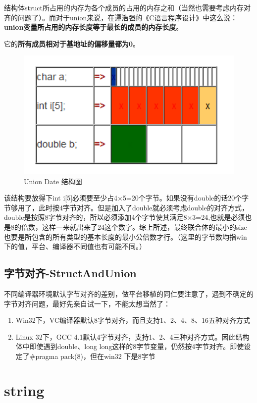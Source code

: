 \documentclass[UTF8,a4paper,12pt]{ctexbook} %
\begin{document}
	        结构体struct所占用的内存为各个成员的占用的内存之和（当然也需要考虑内存对齐的问题了）。而对于union来说，在谭浩强的《C语言程序设计》中这么说：\textbf{union变量所占用的内存长度等于最长的成员的内存长度}。
	        
	        它的\textbf{所有成员相对于基地址的偏移量都为0}。
	        
	        \begin{figure}[H]
	        	\centering
	        	\includegraphics[width = 12cm]{union2.png}
	        	\caption{Union Date 结构图}
	        \end{figure}
	        
	        该结构要放得下int i[5]必须要至少占4×5=20个字节。如果没有double的话20个字节够用了，此时按4字节对齐。但是加入了double就必须考虑double的对齐方式，double是按照8字节对齐的，所以必须添加4个字节使其满足8×3=24,也就是必须也是8的倍数，这样一来就出来了24这个数字。综上所述，最终联合体的最小的size也要是所包含的所有类型的基本长度的最小公倍数才行。（这里的字节数均指win 下的值，平台、编译器不同值也有可能不同。）
	\section{字节对齐-StructAndUnion}
		不同编译器环境默认字节对齐的差别，做平台移植的同仁要注意了，遇到不确定的字节对齐问题，最好先亲自试一下，不能太想当然了：
		\begin{enumerate}
			\item Win32下，VC编译器默认8字节对齐，而且支持1、2、4、8、16五种对齐方式
			\item Linux 32下，GCC 4.1默认4字节对齐，支持1、2、4三种对齐方式。因此结构体中即使遇到double、long long这样的8字节变量，仍然按4字节对齐。即使设定了\#pragma pack(8)，但在win32 下是8字节
		\end{enumerate}	        
         
\chapter{string} 
\end{document}
